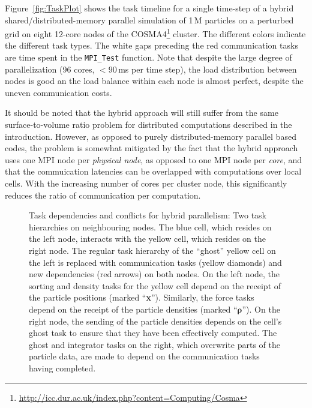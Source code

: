 \documentclass[final]{siamltex}
\newcommand{\fig}[1]
    {Figure~\ref{fig:#1}}
\begin{document}
\fig{TaskPlot} shows the task timeline for a single time-step of a hybrid
shared/distributed-memory parallel simulation of 1\,M particles on a
perturbed grid on eight 12-core nodes of the
COSMA4\footnote{\url{http://icc.dur.ac.uk/index.php?content=Computing/Cosma}} cluster.
The different colors indicate the different task types.
The white gaps preceding the red communication tasks are time spent
in the {\tt MPI\_Test} function.
Note that despite the large degree of parallelization (96 cores, $<90$\,ms
per time step), the load distribution between nodes is good an the
load balance within each node is almost perfect, despite the uneven
communication costs.
        
It should be noted that the hybrid approach will still suffer from the
same surface-to-volume ratio problem for distributed computations
described in the introduction.
However, as opposed to purely distributed-memory parallel based
codes, the problem is somewhat mitigated by the fact that
the hybrid approach uses one MPI node per {\em physical node},
as opposed to one MPI node per {\em core}, and that the commuication
latencies can be overlapped with computations over local cells.
With the increasing number of cores per cluster node,
this significantly reduces the ratio of communication per
computation.


\begin{figure}
    \centerline{}
    
    \caption{Task dependencies and conflicts for hybrid parallelism:
        Two task hierarchies on neighbouring nodes.
        The blue cell, which resides on the left node, interacts
        with the yellow cell, which resides on the right node.
        The regular task hierarchy of the ``ghost'' yellow cell on the
        left is replaced with communication tasks (yellow diamonds)
        and new dependencies (red arrows) on both nodes.
        On the left node, the sorting and density tasks for the yellow cell
        depend on the receipt of the particle positions (marked ``{\bf x}'').
        Similarly, the force tasks depend on the receipt of the
        particle densities (marked ``$\boldsymbol\rho$'').
        On the right node, the sending of the particle densities
        depends on the cell's ghost task to ensure that they have
        been effectively computed.
        The ghost and integrator tasks on the right, which overwrite
        parts of the particle data, are made
        to depend on the communication tasks having completed.
        }
    \label{fig:Hierarchy3}
\end{figure}
\end{document}
